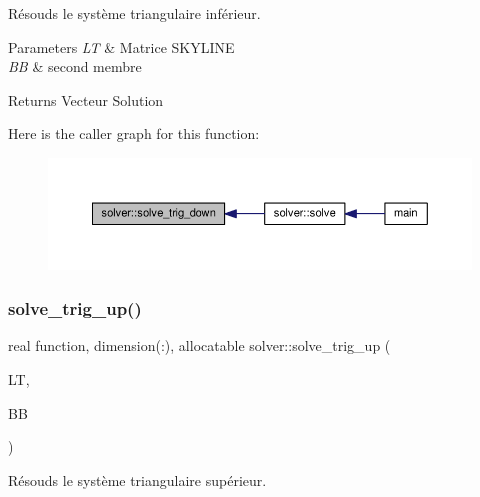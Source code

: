 Résouds le système triangulaire inférieur. 


\begin{DoxyParams}{Parameters}
{\em LT} & Matrice S\+K\+Y\+L\+I\+NE \\
\hline
{\em BB} & second membre \\
\hline
\end{DoxyParams}
\begin{DoxyReturn}{Returns}
Vecteur Solution 
\end{DoxyReturn}
Here is the caller graph for this function\+:
\nopagebreak
\begin{figure}[H]
\begin{center}
\leavevmode
\includegraphics[width=350pt]{namespacesolver_ad8b8ef6c982475b3fb276f93660b750f_icgraph}
\end{center}
\end{figure}
\mbox{\label{namespacesolver_a08b8f70c86d7bf39b32ce8fdcc872fd4}} 
\subsubsection{\texorpdfstring{solve\+\_\+trig\+\_\+up()}{solve\_trig\_up()}}
{\footnotesize\ttfamily real function, dimension(\+:), allocatable solver\+::solve\+\_\+trig\+\_\+up (\begin{DoxyParamCaption}\item[{type(skyline\+\_\+matrix)}]{LT,  }\item[{real, dimension(\+:), allocatable}]{BB }\end{DoxyParamCaption})}



Résouds le système triangulaire supérieur. 


